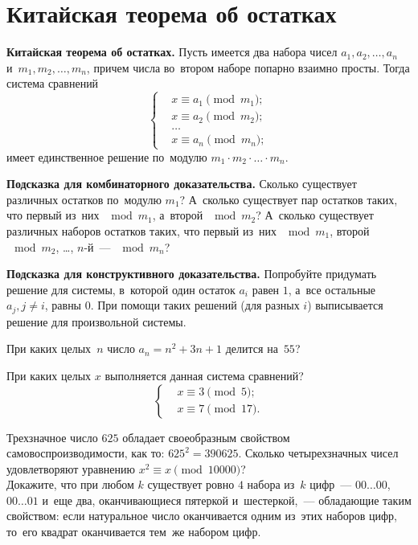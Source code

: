 
\section*{Китайская теорема об остатках}



\begin{problems}

\item\textbf{Китайская теорема об остатках.}
Пусть имеется два набора чисел $a_1, a_2, \ldots, a_n$
и~$m_1, m_2, \dots, m_n$, причем числа во~втором наборе попарно взаимно просты.
Тогда система сравнений
\[ \left\{ \begin{aligned} &
    x \equiv a_1 \pmod {m_1};
\\ &
    x \equiv a_2 \pmod {m_2};
\\ &
    \dots
\\ &
    x \equiv a_n \pmod {m_n};
\end{aligned} \right. \]
имеет единственное решение по~модулю $m_1 \cdot m_2 \cdot \ldots \cdot m_n$.

\textbf{Подсказка для комбинаторного доказательства.}
Сколько существует различных остатков по~модулю $m_1$?
А~сколько существует пар остатков таких, что первый из~них $\mod m_1$,
а~второй $\mod m_2$?
А~сколько существует различных наборов остатков таких, что первый из~них
$\mod m_1$, второй $\mod m_2$, \ldots, $n$-й~--- $\mod m_n$?

\textbf{Подсказка для конструктивного доказательства.}
Попробуйте придумать решение для системы, в~которой один остаток $a_i$
равен $1$, а~все остальные $a_j, j \neq i$, равны $0$.
При помощи таких решений (для разных $i$) выписывается решение для произвольной
системы.

\item
При каких целых~$n$ число $a_n = n^2 + 3n + 1$ делится на~$55$?

\item
При каких целых $x$ выполняется данная система сравнений?
\[ \left\{ \begin{aligned} &
    x \equiv 3 \pmod{5};
\\ &
    x \equiv 7 \pmod{17}.
\end{aligned} \right. \]

\item
\sp
Трехзначное число $625$ обладает своеобразным свойством самовоспроизводимости,
как то: $625^2 = 390 625$.
Сколько четырехзначных чисел удовлетворяют уравнению
$x^2 \equiv x \pmod{10000}$?
\\
\sp
Докажите, что при любом $k$ существует ровно $4$ набора из~$k$ цифр~---
$00\ldots00$, $00\ldots01$ и~еще два, оканчивающиеся пятеркой и~шестеркой,~---
обладающие таким свойством: если натуральное число оканчивается одним из~этих
наборов цифр, то~его квадрат оканчивается тем~же набором цифр.


\end{problems}
